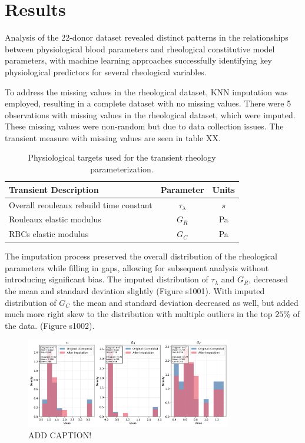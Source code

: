 \documentclass[12pt,letterpaper]{article}
\begin{document}
\newpage
\section{Results}
Analysis of the 22-donor dataset revealed distinct patterns in the relationships between physiological blood parameters and rheological constitutive model parameters,
with machine learning approaches successfully identifying key physiological predictors for several rheological variables.

To address the missing values in the rheological dataset, KNN imputation was employed, resulting in a complete dataset with no missing values. There were
5 observations with missing values in the rheological dataset, which were imputed. These missing values were non-random but due to data collection issues.
The transient measure with missing values are seen in table XX.

\begin{table}[]
    \centering
    \caption{Physiological targets used for the transient rheology parameterization.}
    \begin{tabular}{lcc}
        Transient Description                              & Parameter & Units \\
        \hline
        Overall reouleaux rebuild time constant            & $\tau_{\lambda}$  & $s$ \\
        Rouleaux elastic modulus                           & $G_R$  & Pa \\
        RBCs elastic modulus                               & $G_C$ & Pa
    \end{tabular}
    \label{need label}
\end{table}

The imputation process preserved the overall distribution of the rheological parameters while filling in gaps, allowing for subsequent analysis without introducing
significant bias. The imputed distribution of $\tau_{\lambda}$ and $G_R$, decreased the mean and standard deviation slightly (Figure s1001). With imputed distribution of $G_C$ the mean
and standard deviation decreased as well, but added much more right skew to the distribution with multiple outliers in the top $25\%$ of the data. (Figure s1002).

\begin{figure}[ht]
    \centering
    \includegraphics[width=0.8\textwidth]{s1_001_distributions.png}
    \caption{ADD CAPTION!}
    \label{fig:s1001}
\end{figure}
\end{document}
